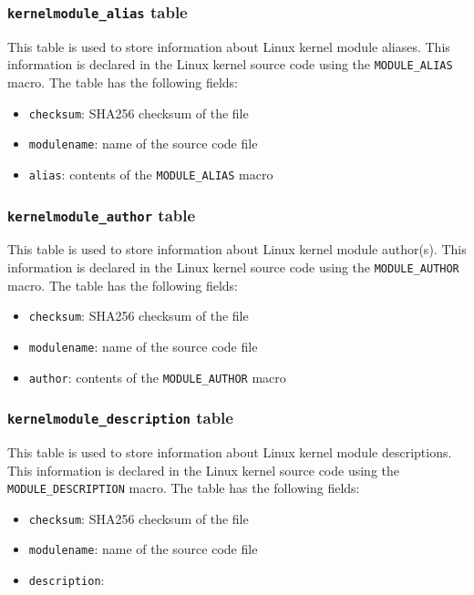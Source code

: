 \documentclass[10pt,a4paper]{article}
\begin{document}
\subsubsection{\texttt{kernelmodule\_alias} table}

This table is used to store information about Linux kernel module aliases. This
information is declared in the Linux kernel source code using the
\texttt{MODULE\_ALIAS} macro. The table has the following fields:

\begin{itemize}
\item \texttt{checksum}: SHA256 checksum of the file
\item \texttt{modulename}: name of the source code file
\item \texttt{alias}: contents of the \texttt{MODULE\_ALIAS} macro
\end{itemize}

\subsubsection{\texttt{kernelmodule\_author} table}

This table is used to store information about Linux kernel module author(s).
This information is declared in the Linux kernel source code using the
\texttt{MODULE\_AUTHOR} macro. The table has the following fields:

\begin{itemize}
\item \texttt{checksum}: SHA256 checksum of the file
\item \texttt{modulename}: name of the source code file
\item \texttt{author}: contents of the \texttt{MODULE\_AUTHOR} macro
\end{itemize}

\subsubsection{\texttt{kernelmodule\_description} table}

This table is used to store information about Linux kernel module descriptions.
This information is declared in the Linux kernel source code using the
\texttt{MODULE\_DESCRIPTION} macro. The table has the following fields:

\begin{itemize}
\item \texttt{checksum}: SHA256 checksum of the file
\item \texttt{modulename}: name of the source code file
\item \texttt{description}:
\end{itemize}
\end{document}
